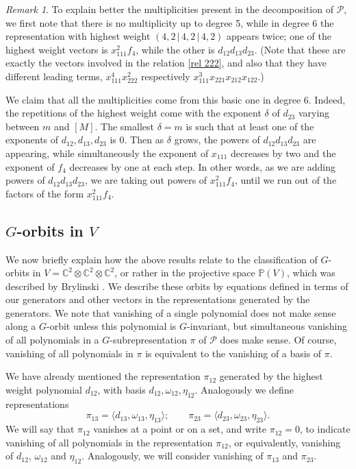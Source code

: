 \documentclass[reqno,11pt]{amsart}
\theoremstyle{remark}
\newtheorem{rem}[equation]{Remark}
\theoremstyle{definition}
\numberwithin{equation}{section}
\newcommand{\bbar}{\,\big|\,}
\newcommand\ot{\otimes}
\newcommand{\bbC}{\mathbb{C}}
\newcommand{\Pol}{\mathcal{P}}
\newcommand{\bbP}{\mathbb{P}}
\begin{document}
\begin{rem}
\label{rmk mult}
To explain better the multiplicities present in the decomposition of $\Pol$, we first note that there is no multiplicity up to degree 5, while in degree 6 the representation with highest weight $(4,2\bbar 4,2\bbar 4,2)$ appears twice; one of the highest weight vectors is $x_{111}^2f_4$, while the other is $d_{12}d_{13}d_{23}$. (Note that these are exactly the vectors involved in the relation \eqref{rel 222}, and also that they have different leading terms, $x_{111}^4x_{222}^2$ respectively $x_{111}^3x_{221}x_{212}x_{122}$.)

We claim that all the multiplicities come from this basic one in degree 6. Indeed, the repetitions of the highest weight come with the exponent $\delta$ of $d_{23}$ varying between $m$ and $[M]$. The smallest $\delta=m$ is such that at least one of the exponents of $d_{12},d_{13},d_{23}$ is 0. Then as $\delta$ grows,  the powers of $d_{12}d_{13}d_{23}$ are appearing, while simultaneously  
the exponent of $x_{111}$ decreases by two and the exponent of $f_4$ decreases by one at each step. In other words, as we are adding powers of $d_{12}d_{13}d_{23}$, we are taking out powers of $x_{111}^2f_4$, until we run out of the factors of the form $x_{111}^2f_4$.
\end{rem}

\subsection{$G$-orbits in $V$ }We now briefly explain how the above results relate to the classification of $G$-orbits in $V=\bbC^2\ot\bbC^2\ot\bbC^2$, or rather in the projective space $\bbP(V)$, which was described by 
Brylinski \cite[Proposition 1.7]{B}. We describe these orbits by equations defined in terms of our generators and other vectors in the representations generated by the generators. We note that vanishing of a single polynomial does not make sense along a $G$-orbit unless this polynomial is $G$-invariant, but simultaneous vanishing of all polynomials in a 
$G$-subrepresentation $\pi$ of $\Pol$ does make sense. Of course, vanishing of all polynomials in $\pi$ is equivalent to the vanishing of a basis of $\pi$.

We have already mentioned the representation $\pi_{12}$ generated by the highest weight polynomial $d_{12}$, with basis $d_{12},\omega_{12},\eta_{12}$.  Analogously we define representations
\[
\pi_{13}=\langle d_{13},\omega_{13},\eta_{13}\rangle;\qquad \pi_{23}=\langle d_{23},\omega_{23},\eta_{23}\rangle.
\]
We will say that $\pi_{12}$ vanishes at a point or on a set, and write $\pi_{12}=0$, to indicate vanishing of all polynomials in the representation $\pi_{12}$, or equivalently, vanishing of $d_{12}$, $\omega_{12}$ and $\eta_{12}$. Analogously, we will consider vanishing of $\pi_{13}$ and $\pi_{23}$.
\end{document}

